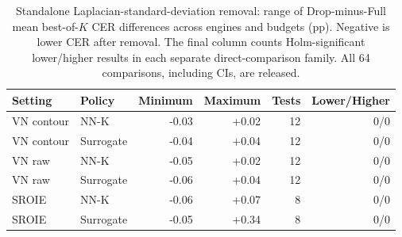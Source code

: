 \begin{table}[htbp]
\centering\small
\caption{Standalone Laplacian-standard-deviation removal: range of Drop-minus-Full mean best-of-$K$ CER differences across engines and budgets (pp). Negative is lower CER after removal. The final column counts Holm-significant lower/higher results in each separate direct-comparison family. All 64 comparisons, including CIs, are released.}
\label{tab:noise_direct_ranges}
\begin{tabular}{llrrrr}\toprule
Setting & Policy & Minimum & Maximum & Tests & Lower/Higher \\\midrule
VN contour & NN-K & -0.03 & +0.02 & 12 & 0/0 \\
VN contour & Surrogate & -0.04 & +0.04 & 12 & 0/0 \\
VN raw & NN-K & -0.05 & +0.02 & 12 & 0/0 \\
VN raw & Surrogate & -0.06 & +0.04 & 12 & 0/0 \\
SROIE & NN-K & -0.06 & +0.07 & 8 & 0/0 \\
SROIE & Surrogate & -0.05 & +0.34 & 8 & 0/0 \\
\bottomrule\end{tabular}\end{table}

\begin{table}[htbp]
\centering\small
\caption{All 7 policy comparisons whose Holm-adjusted significance classification changes after removing only the standalone column. Differences are first policy minus second (pp); negative favors the first. $p_H$ uses the same prespecified block/contrast family in each condition (12 tests for each Vietnamese block, eight for SROIE). These threshold crossings are not formal tests of a difference between contrasts. Full-precision results for all 160 comparisons per condition are released.}
\label{tab:noise_changed_conclusions}
\end{table}

